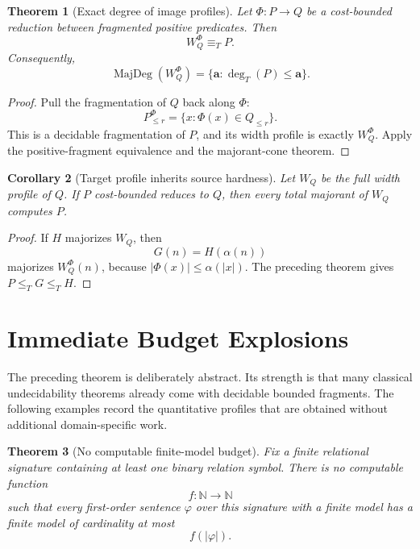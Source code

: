 \documentclass[11pt]{article}
\newtheorem{theorem}{Theorem}[section]
\newtheorem{corollary}[theorem]{Corollary}
\begin{document}
\begin{theorem}[Exact degree of image profiles]
Let \(\Phi:P\to Q\) be a cost-bounded reduction between fragmented positive predicates. Then
\[
W_Q^\Phi\equiv_T P.
\]
Consequently,
\[
\operatorname{MajDeg}(W_Q^\Phi)
=
\{\mathbf a:\deg_T(P)\le \mathbf a\}.
\]
\end{theorem}

\begin{proof}
Pull the fragmentation of \(Q\) back along \(\Phi\):
\[
P_{\le r}^{\Phi}=\{x:\Phi(x)\in Q_{\le r}\}.
\]
This is a decidable fragmentation of \(P\), and its width profile is exactly \(W_Q^\Phi\). Apply the positive-fragment equivalence and the majorant-cone theorem.
\end{proof}

\begin{corollary}[Target profile inherits source hardness]
Let \(W_Q\) be the full width profile of \(Q\). If \(P\) cost-bounded reduces to \(Q\), then every total majorant of \(W_Q\) computes \(P\).
\end{corollary}

\begin{proof}
If \(H\) majorizes \(W_Q\), then
\[
G(n)=H(\alpha(n))
\]
majorizes \(W_Q^\Phi(n)\), because \(|\Phi(x)|\le\alpha(|x|)\). The preceding theorem gives \(P\le_T G\le_T H\).
\end{proof}

\section{Immediate Budget Explosions}

The preceding theorem is deliberately abstract. Its strength is that many classical undecidability theorems already come with decidable bounded fragments. The following examples record the quantitative profiles that are obtained without additional domain-specific work.

\begin{theorem}[No computable finite-model budget]
Fix a finite relational signature containing at least one binary relation symbol. There is no computable function
\[
f:\mathbb N\to\mathbb N
\]
such that every first-order sentence \(\varphi\) over this signature with a finite model has a finite model of cardinality at most
\[
f(|\varphi|).
\]
\end{theorem}
\end{document}

